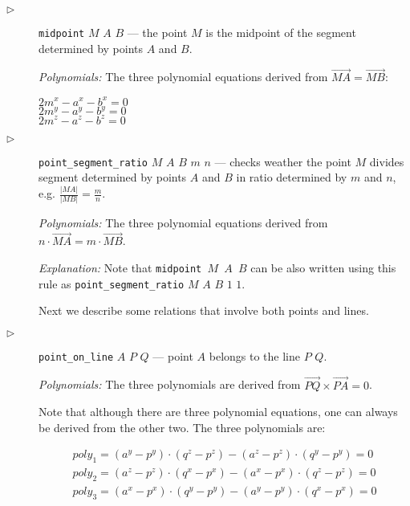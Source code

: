 \documentclass[final,1p,times,authoryear]{elsarticle}
\begin{document}
\begin{description}
\item[$\triangleright$] {\tt midpoint} $M$ $A$ $B$ --- the point
  $M$ is the midpoint of the segment determined by points $A$ and
  $B$.

{\em Polynomials:} The three polynomial equations derived from $\overrightarrow{MA} = \overrightarrow{MB}$:

\begin{tabbing}
$2m^x - a^x - b^x = 0$ \\ 
$2m^y - a^y - b^y = 0$ \\ 
$2m^z - a^z - b^z = 0$
\end{tabbing}

\item[$\triangleright$] {\tt point\_segment\_ratio} $M$ $A$ $B$ $m$
  $n$ --- checks weather the point $M$ divides segment determined by
  points $A$ and $B$ in ratio determined by $m$ and $n$,
  e.g. $\frac{|MA|}{|MB|} = \frac{m}{n}$.

{\em Polynomials:} The three polynomial equations derived from
$n\cdot \overrightarrow{MA} = m\cdot \overrightarrow{MB}$.

{\em Explanation:} Note that {\tt midpoint $M$ $A$ $B$} can be
also written using this rule as {\tt point\_segment\_ratio} $M$ $A$
$B$ $1$ $1$.

\bigskip

Next we describe some relations that involve both points and lines.

\item[$\triangleright$] {\tt point\_on\_line} $A$ $P$ $Q$ --- point $A$ belongs
  to the line $P$ $Q$.

{\em Polynomials:} The three polynomials are derived from
$\overrightarrow{PQ} \times \overrightarrow{PA} = 0$.

Note that although there are three polynomial equations, one can
always be derived from the other two. The three polynomials are:

\begin{eqnarray*}
  poly_1 = (a^y - p^y)\cdot (q^z - p^z) - (a^z - p^z)\cdot (q^y - p^y) = 0\\
  poly_2 = (a^z - p^z)\cdot (q^x - p^x) - (a^x - p^x)\cdot (q^z - p^z) = 0\\
  poly_3 = (a^x - p^x)\cdot (q^y - p^y) - (a^y - p^y)\cdot (q^x - p^x) = 0
\end{eqnarray*}


\end{description}
\end{document}
